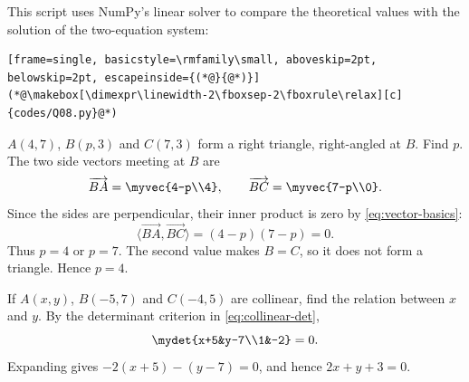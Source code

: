 \begin{enumerate}[label={},leftmargin=0pt,itemsep=9pt]
This script uses NumPy's linear solver to compare the theoretical values with the solution of the two-equation system:
\begin{lstlisting}[frame=single, basicstyle=\rmfamily\small, aboveskip=2pt, belowskip=2pt, escapeinside={(*@}{@*)}]
(*@\makebox[\dimexpr\linewidth-2\fboxsep-2\fboxrule\relax][c]{codes/Q08.py}@*)
\end{lstlisting}
\setcounter{qcurrent}{9}\setcounter{equation}{0}
 $A(4,7)$, $B(p,3)$ and $C(7,3)$ form a right triangle, right-angled at $B$. Find $p$.
\solution The two side vectors meeting at $B$ are
\begin{equation}
\overrightarrow{BA}=\myvec{4-p\\4},\qquad \overrightarrow{BC}=\myvec{7-p\\0}.
\end{equation}
Since the sides are perpendicular, their inner product is zero by \eqref{eq:vector-basics}:
\begin{equation}
\langle\overrightarrow{BA},\overrightarrow{BC}\rangle=(4-p)(7-p)=0.
\end{equation}
Thus $p=4$ or $p=7$. The second value makes $B=C$, so it does not form a triangle. Hence $\boxed{p=4}$.




\setcounter{qcurrent}{10}\setcounter{equation}{0}
 If $A(x,y)$, $B(-5,7)$ and $C(-4,5)$ are collinear, find the relation between $x$ and $y$.
\solution By the determinant criterion in \eqref{eq:collinear-det},
\begin{equation}
\mydet{x+5&y-7\\1&-2}=0.
\end{equation}
Expanding gives $-2(x+5)-(y-7)=0$, and hence $\boxed{2x+y+3=0}$.



\end{enumerate}

\newpage
